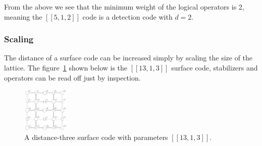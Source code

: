 From the above we see that the minimum weight of the logical operators is 2, meaning the $[[5,1,2]]$ code is a detection code with $d=2$.

\subsubsection{Scaling}

The distance of a surface code can be increased simply by scaling the size of the lattice. The figure~\ref{fig:1313} shown below is the $[[13, 1, 3]]$ surface code, stabilizers and operators can be read off just by inspection.
\begin{figure}[h]
    \centering
    \includegraphics[width=0.2\textwidth]{sections/2_review_surface_code/1313.png}
    \caption{A distance-three surface code with parameters $[[13, 1, 3]]$.}
    \label{fig:1313}
\end{figure}